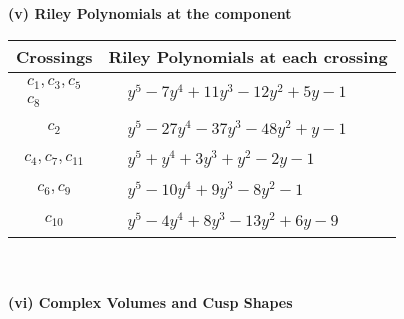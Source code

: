 \documentclass[1p]{elsarticle_modified}
\theoremstyle{definition}
\begin{document}
\newpage\renewcommand{\arraystretch}{1}
\flushleft \textbf{(v) Riley Polynomials at the component}\newline \\
\begin{tabular}{m{50pt}|m{274pt}}
Crossings & \hspace{64pt}Riley Polynomials at each crossing \\
\hline $$\begin{aligned}c_{1},c_{3},c_{5}\\c_{8}\end{aligned}$$&$\begin{aligned}
&y^5-7 y^4+11 y^3-12 y^2+5 y-1
\end{aligned}$\\
\hline $$\begin{aligned}c_{2}\end{aligned}$$&$\begin{aligned}
&y^5-27 y^4-37 y^3-48 y^2+y-1
\end{aligned}$\\
\hline $$\begin{aligned}c_{4},c_{7},c_{11}\end{aligned}$$&$\begin{aligned}
&y^5+y^4+3 y^3+y^2-2 y-1
\end{aligned}$\\
\hline $$\begin{aligned}c_{6},c_{9}\end{aligned}$$&$\begin{aligned}
&y^5-10 y^4+9 y^3-8 y^2-1
\end{aligned}$\\
\hline $$\begin{aligned}c_{10}\end{aligned}$$&$\begin{aligned}
&y^5-4 y^4+8 y^3-13 y^2+6 y-9
\end{aligned}$\\
\hline
\end{tabular}\\~\\
\newpage\flushleft \textbf{(vi) Complex Volumes and Cusp Shapes}
\end{document}
